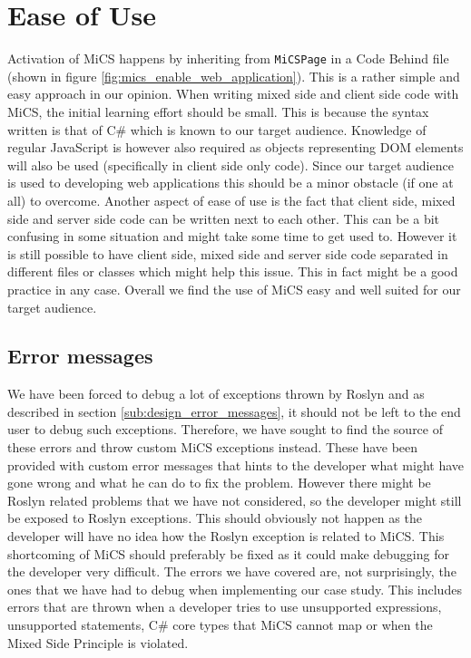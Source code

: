\section{Ease of Use} %
\label{sec:ease_of_use}
	Activation of MiCS happens by inheriting from \texttt{MiCSPage} in a Code Behind file (shown in figure \ref{fig:mics_enable_web_application}). This is a rather simple and easy approach in our opinion. When writing mixed side and client side code with MiCS, the initial learning effort should be small. This is because the syntax written is that of C\# which is known to our target audience. Knowledge of regular JavaScript is however also required as objects representing DOM elements will also be used (specifically in client side only code). Since our target audience is used to developing web applications this should be a minor obstacle (if one at all) to overcome. Another aspect of ease of use is the fact that client side, mixed side and server side code can be written next to each other. This can be a bit confusing in some situation and might take some time to get used to. However it is still possible to have client side, mixed side and server side code separated in different files or classes which might help this issue. This in fact might be a good practice in any case. Overall we find the use of MiCS easy and well suited for our target audience.

	\subsection{Error messages} %
	\label{sub:evaluation_of_error_messages}
		We have been forced to debug a lot of exceptions thrown by Roslyn and as described in section \ref{sub:design_error_messages}, it should not be left to the end user to debug such exceptions. Therefore, we have sought to find the source of these errors and throw custom MiCS exceptions instead. These have been provided with custom error messages that hints to the developer what might have gone wrong and what he can do to fix the problem. However there might be Roslyn related problems that we have not considered, so the developer might still be exposed to Roslyn exceptions. This should obviously not happen as the developer will have no idea how the Roslyn exception is related to MiCS. This shortcoming of MiCS should preferably be fixed as it could make debugging for the developer very difficult. The errors we have covered are, not surprisingly, the ones that we have had to debug when implementing our case study. This includes errors that are thrown when a developer tries to use unsupported expressions, unsupported statements, C\# core types that MiCS cannot map or when the Mixed Side Principle is violated.

	

